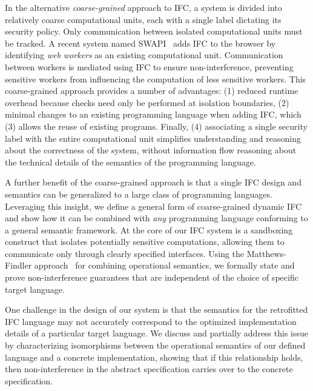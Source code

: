 In the alternative \textit{coarse-grained} approach to IFC,
a system is divided into relatively coarse computational units,
each with a single label dictating its security policy.
Only
communication between isolated computational units must be tracked.
A recent system named SWAPI~\cite{swapi} adds IFC to the
browser by identifying \emph{web workers} as an existing computational
unit.  Communication between workers is mediated using
IFC to ensure non-interference, preventing sensitive workers from
influencing the computation of less sensitive workers.
This coarse-grained approach provides a number of advantages:
(1) reduced runtime overhead because checks need only
be performed at isolation boundaries, (2) minimal changes to an
existing programming language when adding IFC, which (3) allows
the reuse of existing programs.  Finally, (4) associating
a single security label with the entire computational unit simplifies
understanding and reasoning about the correctness of the
system, without information flow reasoning about the
technical details of the semantics of the programming language.

A further benefit of the coarse-grained approach
is that a single IFC design and semantics can be generalized
to a large class of programming languages.
Leveraging this insight, we define a general form of coarse-grained
dynamic IFC and show how it can be combined with \emph{any} programming
language conforming to a general semantic framework.
At the core of our IFC system is a sandboxing construct that isolates
potentially sensitive computations, allowing them to
communicate only through clearly specified interfaces.
Using the Matthews-Findler approach~\cite{Matthews:2007:OSM:1190216.1190220}
for combining operational semantics,
we formally state and prove non-interference guarantees that are
independent of the choice of specific target language.

One challenge in the design of our system is that the semantics for the
retrofitted IFC language may not accurately correspond to the optimized
implementation details of a particular target language.
We discuss and partially address this issue
by characterizing isomorphisms between the operational semantics of our
defined language and a concrete implementation, showing that if this
relationship holds, then non-interference in the abstract specification
carries over to the concrete specification.

